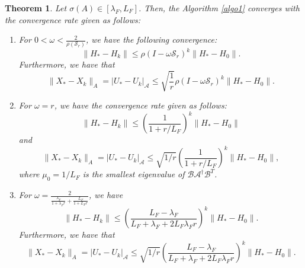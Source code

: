 \documentclass{article}
\newtheorem{theorem}{Theorem}
\theoremstyle{definition}
\begin{document}
\begin{theorem}
Let $\sigma(A) \in [\lambda_F, L_F]$. Then, the Algorithm \ref{algo1} converges with the convergence rate given as follows:
\begin{enumerate}
\item For $0 < \omega < \frac{2}{\rho(\mathcal{S}_r)}$, we have the following convergence:
\begin{equation}
\|H_* - H_k\| \leq \rho(I - \omega \mathcal{S}_r)^k \|H_* - H_0\|. 
\end{equation}
Furthermore, we have that 
\begin{equation}
\|X_* - X_k\|_A = |U_* - U_k|_{\mathcal{A}} \leq \sqrt{\frac{1}{r}}\rho(I - \omega \mathcal{S}_r)^k \|H_* - H_0\|. 
\end{equation} 
\item For $\omega = r$, we have the convergence rate given as follows: 
\begin{equation}
\|H_* - H_k\| \leq \left ( \frac{1}{1 + r/L_F}\right )^k \|H_* - H_0\| 
\end{equation} 
and 
\begin{equation}
\|X_* - X_k\|_A = |U_* - U_k|_{\mathcal{A}} \leq \sqrt{1/r} \left ( \frac{1}{1 + r/ L_F}\right )^k \|H_* - H_0\|,  
\end{equation} 
where $\mu_0 = 1/L_F$ is the smallest eigenvalue of $\mathcal{B} \mathcal{A}^{\dag} \mathcal{B}^T$.
\item For $\omega = \frac{2}{ \frac{\lambda_F}{1 + \lambda_F r} + \frac{L_F}{1 + L_F r}}$, we have 
\begin{equation}
\|H_* - H_k\| \leq \left ( \frac{L_F - \lambda_F}{L_F + \lambda_F + 2L_F \lambda_F r} \right )^k \|H_* - H_0\|. 
\end{equation}
Furthermore, we have that 
\begin{equation}
\|X_* - X_k\|_A = |U_* - U_k|_{\mathcal{A}} \leq \sqrt{1/r} \left ( \frac{L_F - \lambda_F}{L_F + \lambda_F + 2L_F \lambda_F r} \right )^k \|H_* - H_0\|. 
\end{equation} 
\end{enumerate} 
\end{theorem} 
\end{document}
